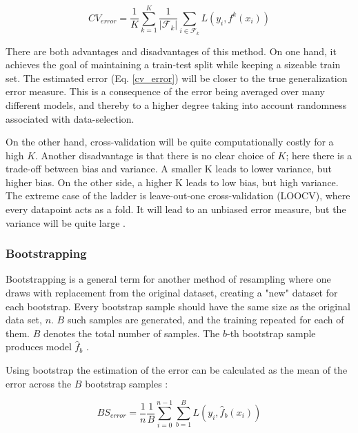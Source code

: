 \begin{equation}\label{cv_error}
    CV_{error} = \frac{1}{K} \sum_{k=1}^{K} \frac{1}{|\mathcal{F}_k|} \sum_{i \in \mathcal{F}_k} L\left(y_i, f^{k}({x}_i)\right) 
\end{equation}

There are both advantages and disadvantages of this method. On one hand, it achieves the goal of maintaining a train-test split while keeping a sizeable train set. 
The estimated error (Eq. \ref{cv_error}) will be closer to the true generalization error measure. This is a consequence of the error being averaged over many different models, and thereby to a higher degree taking into account randomness associated with data-selection.  

On the other hand, cross-validation will be quite computationally costly for a high $K$. Another disadvantage is that there is no clear choice of $K$; here there is a trade-off between bias and variance. A smaller K leads to lower variance, but higher bias. On the other side, a higher K leads to low bias, but high variance. The extreme case of the ladder is leave-out-one cross-validation (LOOCV), where every datapoint acts as a fold. It will lead to an unbiased error measure, but the variance will be quite large \citep[p. 242]{hastie}.

\subsubsection{Bootstrapping}
Bootstrapping is a general term for another method of resampling where one draws with replacement from the original dataset, creating a "new" dataset for each bootstrap. Every bootstrap sample should have the same size as the original data set, $n$. $B$ such samples are generated, and the training repeated for each of them. $B$ denotes the total number of samples. 
The $b$-th bootstrap sample produces model $\hat{f}_b$ \citep[p. 249]{hastie}.

Using bootstrap the estimation of the error can be calculated as the mean of the error across the $B$ bootstrap samples \cite[p. 250]{hastie}:

\begin{equation}\label{bs_error}
    BS_{error} = \frac{1}{n}\frac{1}{B}\sum_{i=0}^{n-1}\sum_{b=1}^{B} L\left(y_i, \hat{f}_b(x_i)\right)
\end{equation}
\


